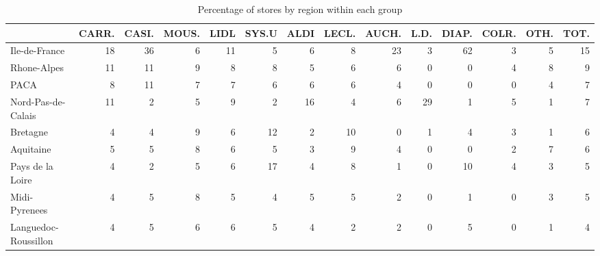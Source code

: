 \documentclass[11pt]{article}
\begin{document}
\begin{table}[H]
\caption{Percentage of stores by region within each group}
\footnotesize
\setlength{\tabcolsep}{2pt}

\begin{tabular}{lrrrrrrrrrrrrr}
\toprule
{} &      CARR. &      CASI. &      MOUS. &       LIDL &      SYS.U &       ALDI &      LECL. &      AUCH. &       L.D. &      DIAP. &      COLR. &       OTH. &       TOT. \\
\midrule
Ile-de-France        &         18 &         36 &          6 &         11 &          5 &          6 &          8 &         23 &          3 &         62 &          3 &          5 &         15 \\
Rhone-Alpes          &         11 &         11 &          9 &          8 &          8 &          5 &          6 &          6 &          0 &          0 &          4 &          8 &          9 \\
PACA                 &          8 &         11 &          7 &          7 &          6 &          6 &          6 &          4 &          0 &          0 &          0 &          4 &          7 \\
Nord-Pas-de-Calais   &         11 &          2 &          5 &          9 &          2 &         16 &          4 &          6 &         29 &          1 &          5 &          1 &          7 \\
Bretagne             &          4 &          4 &          9 &          6 &         12 &          2 &         10 &          0 &          1 &          4 &          3 &          1 &          6 \\
Aquitaine            &          5 &          5 &          8 &          6 &          5 &          3 &          9 &          4 &          0 &          0 &          2 &          7 &          6 \\
Pays de la Loire     &          4 &          2 &          5 &          6 &         17 &          4 &          8 &          1 &          0 &         10 &          4 &          3 &          5 \\
Midi-Pyrenees        &          4 &          5 &          8 &          5 &          4 &          5 &          5 &          2 &          0 &          1 &          0 &          3 &          5 \\
Languedoc-Roussillon &          4 &          5 &          6 &          6 &          5 &          4 &          2 &          2 &          0 &          5 &          0 &          1 &          4 \\

\end{tabular}
\end{table}
\end{document}
